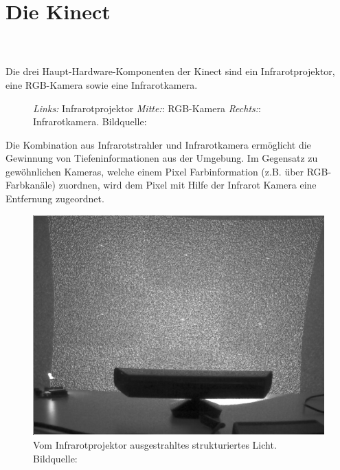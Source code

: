 \chapter{Die Kinect}
\label{ch:kinect}
\\\\
Die drei Haupt-Hardware-Komponenten der Kinect sind ein Infrarotprojektor, eine RGB-Kamera sowie eine Infrarotkamera.\\
\begin{figure}[!ht]
  \centering
   \caption{\emph {Links:} Infrarotprojektor \emph {Mitte:}: RGB-Kamera  \emph {Rechts:}: Infrarotkamera. Bildquelle:\cite{borenstein2012making}  }
\end{figure}
Die Kombination aus Infrarotstrahler und Infrarotkamera ermöglicht die Gewinnung von Tiefeninformationen aus der Umgebung. Im Gegensatz zu gewöhnlichen Kameras, welche einem Pixel Farbinformation (z.B.  über RGB-Farbkanäle) zuordnen, wird dem Pixel mit Hilfe der Infrarot Kamera eine Entfernung zugeordnet.

\begin{figure}
\centering
\includegraphics[width=0.5\linewidth]{./Res/Kinect_9Points}
\caption{Vom Infrarotprojektor ausgestrahltes strukturiertes Licht. Bildquelle:\cite{Kramer}}
\label{fig:Kinect_9Points}
\end{figure}


